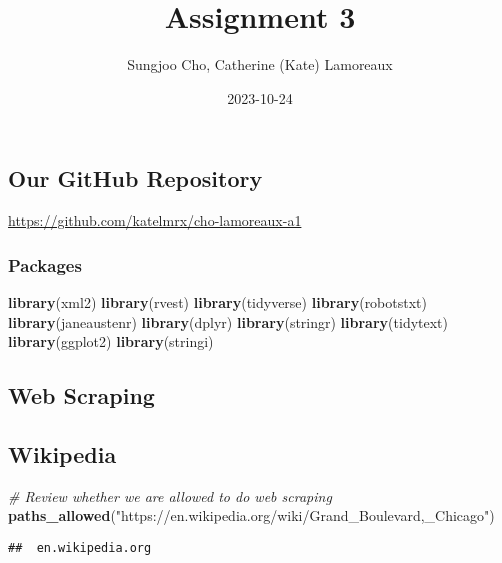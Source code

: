 \documentclass[
]{article}
\title{Assignment 3}
\author{Sungjoo Cho, Catherine (Kate) Lamoreaux}
\date{2023-10-24}
\newenvironment{Shaded}{\begin{snugshade}}{\end{snugshade}}
\newcommand{\CommentTok}[1]{\textcolor[rgb]{0.56,0.35,0.01}{\textit{#1}}}
\newcommand{\FunctionTok}[1]{\textcolor[rgb]{0.13,0.29,0.53}{\textbf{#1}}}
\newcommand{\NormalTok}[1]{#1}
\newcommand{\StringTok}[1]{\textcolor[rgb]{0.31,0.60,0.02}{#1}}
\begin{document}
\maketitle

\hypertarget{our-github-repository}{%
\subsection{Our GitHub Repository}\label{our-github-repository}}

\url{https://github.com/katelmrx/cho-lamoreaux-a1}

\hypertarget{packages}{%
\subsubsection{Packages}\label{packages}}

\begin{Shaded}
\begin{Highlighting}[]
\FunctionTok{library}\NormalTok{(xml2)}
\FunctionTok{library}\NormalTok{(rvest)}
\FunctionTok{library}\NormalTok{(tidyverse)}
\FunctionTok{library}\NormalTok{(robotstxt)}
\FunctionTok{library}\NormalTok{(janeaustenr)}
\FunctionTok{library}\NormalTok{(dplyr)}
\FunctionTok{library}\NormalTok{(stringr)}
\FunctionTok{library}\NormalTok{(tidytext)}
\FunctionTok{library}\NormalTok{(ggplot2)}
\FunctionTok{library}\NormalTok{(stringi)}
\end{Highlighting}
\end{Shaded}

\hypertarget{web-scraping}{%
\subsection{Web Scraping}\label{web-scraping}}

\hypertarget{wikipedia}{%
\subsection{Wikipedia}\label{wikipedia}}

\begin{Shaded}
\begin{Highlighting}[]
\CommentTok{\# Review whether we are allowed to do web scraping}
\FunctionTok{paths\_allowed}\NormalTok{(}\StringTok{"https://en.wikipedia.org/wiki/Grand\_Boulevard,\_Chicago"}\NormalTok{)}
\end{Highlighting}
\end{Shaded}

\begin{verbatim}
##  en.wikipedia.org
\end{verbatim}
\end{document}
